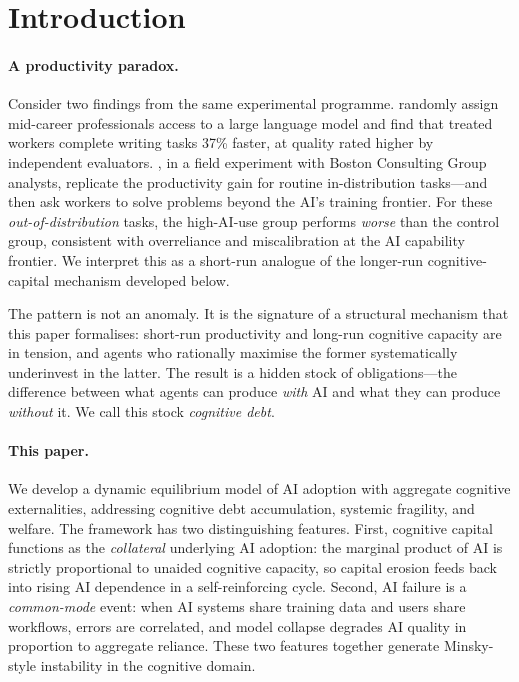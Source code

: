 \documentclass[12pt]{article}
\begin{document}
\newpage

\section{Introduction}
\label{sec:intro}

\paragraph{A productivity paradox.}
Consider two findings from the same experimental programme.
\citet{NoyZhang2023} randomly assign mid-career professionals access to a large
language model and find that treated workers complete writing tasks 37\% faster,
at quality rated higher by independent evaluators.
\citet{DellAcquaEtAl2023}, in a field experiment with Boston Consulting Group
analysts, replicate the productivity gain for routine in-distribution tasks---and
then ask workers to solve problems beyond the AI's training frontier.
For these \emph{out-of-distribution} tasks, the high-AI-use group
performs \emph{worse} than the control group, consistent with overreliance
and miscalibration at the AI capability frontier. We interpret this as a
short-run analogue of the longer-run cognitive-capital mechanism developed below.

The pattern is not an anomaly. It is the signature of a structural mechanism that
this paper formalises: short-run productivity and long-run cognitive capacity are
in tension, and agents who rationally maximise the former systematically underinvest
in the latter. The result is a hidden stock of obligations---the difference between
what agents can produce \emph{with} AI and what they can produce \emph{without} it.
We call this stock \emph{cognitive debt}.

\paragraph{This paper.}
We develop a dynamic equilibrium model of AI adoption with aggregate cognitive
externalities, addressing cognitive debt accumulation, systemic fragility, and welfare. The framework has two distinguishing features.
First, cognitive capital functions as the \emph{collateral} underlying AI adoption:
the marginal product of AI is strictly proportional to unaided cognitive capacity,
so capital erosion feeds back into rising AI dependence in a self-reinforcing cycle.
Second, AI failure is a \emph{common-mode} event: when AI systems share training
data and users share workflows, errors are correlated, and model collapse
\citep{ShumailovEtAl2024} degrades AI quality in proportion to aggregate reliance.
These two features together generate Minsky-style instability in the cognitive domain.
\end{document}
